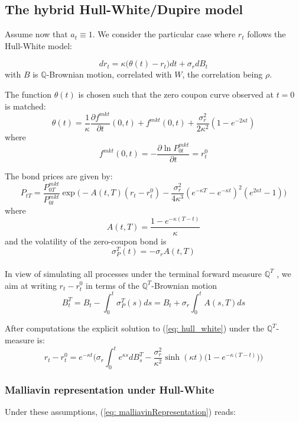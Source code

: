 \subsection{The hybrid Hull-White/Dupire model}\label{subsec: hwDupire}
Assume now that $a_t \equiv 1$. We consider the particular case where $r_t$ follows the Hull-White model:

\begin{equation}\label{eq: hull_white}
dr_t = \kappa\big(\theta(t)-r_t\big)dt+\sigma_r dB_t
\end{equation}
with $B$ is $\mathbb{Q}$-Brownian motion, correlated with $W$, the correlation being $\rho$.

The function $ \theta(t)$ is chosen such that the zero coupon curve observed at $t = 0$ is matched:
$$\theta(t) = \frac{1}{\kappa}\frac{\partial f^{mkt}}{\partial t}(0,t)+f^{mkt}(0,t)+\frac{\sigma_r^2}{2\kappa^2}(1-e^{-2\kappa t})  $$
where
$$f^{mkt}(0,t)=-\frac{\partial\ln P_{0t}^{mkt}}{\partial t} = r_t^0$$

The bond prices are given by:
\begin{equation}\label{eq: bondPrice_hullWhite}
P_{tT}= \frac{P_{0T}^{mkt}}{P_{0t}^{mkt}}\exp\bigg( -A(t,T)(r_t-r_t^0)-\frac{\sigma_r^2}{4\kappa^3}(e^{-\kappa T}-e^{-\kappa t})^2(e^{2\kappa t}-1)     \bigg)
\end{equation}
where
$$A(t,T)= \frac{1-e^{ -\kappa(T-t) }}{\kappa}$$
and the volatility of the zero-coupon bond is 
$$\sigma_P^T(t)=-\sigma_r A(t,T)$$\\

In view of simulating all processes under the terminal forward measure $\mathbb{Q}^T$ ,
we aim at writing $r_t -r_t^0$ in terms of the $\mathbb{Q}^T$-Brownian motion
$$ B^T_t=B_t-\int_0^t\sigma_P^T(s)ds=B_t+\sigma_r\int_0^tA(s,T)ds $$

After computations the explicit solution to (\ref{eq: hull_white}) under the $\mathbb{Q}^T$-measure is:
\begin{equation}\label{eq: hullWhiteSolution}
r_t -r_t^0= e^{-\kappa t}\bigg(\sigma_r\int_0^t e^{\kappa s}dB_s^T-\frac{\sigma_r^2}{\kappa^2}\sinh(\kappa t)\big(1-e^{-\kappa(T-t)} \big)   \bigg)
\end{equation}

\subsubsection{Malliavin representation under Hull-White}\label{subsec: malliavin1F}
Under these assumptions, (\ref{eq: malliavinRepresentation}) reads:

